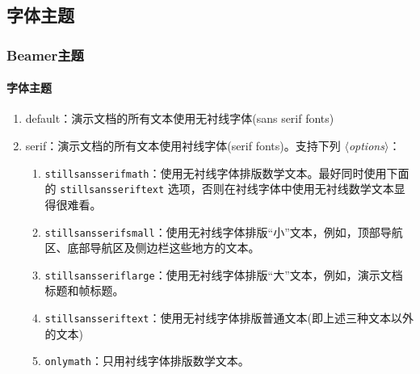\documentclass{beamer}
\newcommand\m[1]{\mbox{$\langle${\rmfamily\textit{#1}\/}$\rangle$}}
\begin{document}
\subsection{字体主题}
\begin{frame}
\frametitle{Beamer主题}
\framesubtitle{字体主题}
\begin{enumerate}[I]
\item default：演示文档的所有文本使用无衬线字体(sans serif fonts)
\item serif：演示文档的所有文本使用衬线字体(serif fonts)。支持下列 \m{options}：
\begin{enumerate}
	\item \verb|stillsansserifmath|：使用无衬线字体排版数学文本。最好同时使用下面的 \verb|stillsansseriftext| 选项，否则在衬线字体中使用无衬线数学文本显得很难看。
	\item \verb|stillsansserifsmall|：使用无衬线字体排版“小”文本，例如，顶部导航区、底部导航区及侧边栏这些地方的文本。
	\item \verb|stillsansseriflarge|：使用无衬线字体排版“大”文本，例如，演示文档标题和帧标题。
	\item \verb|stillsansseriftext|：使用无衬线字体排版普通文本(即上述三种文本以外的文本)
	\item \verb|onlymath|：只用衬线字体排版数学文本。
\end{enumerate}

\end{enumerate}
\end{frame}
\end{document}
